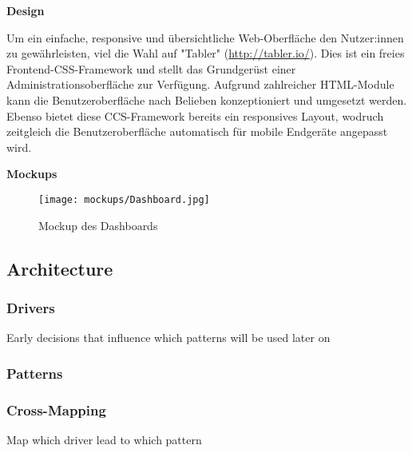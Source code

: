 \textbf{Design}

Um ein einfache, responsive und übersichtliche Web-Oberfläche den Nutzer:innen zu gewährleisten, viel die Wahl auf "Tabler" (\href{http://tabler.io/}{http://tabler.io/}). Dies ist ein freies Frontend-CSS-Framework
und stellt das Grundgerüst einer Administrationsoberfläche zur Verfügung. Aufgrund zahlreicher HTML-Module kann die Benutzeroberfläche nach Belieben konzeptioniert und 
umgesetzt werden. Ebenso bietet diese CCS-Framework bereits ein responsives Layout, wodruch zeitgleich die Benutzeroberfläche automatisch für mobile Endgeräte angepasst wird.

\textbf{Mockups}

\begin{figure}
\centering
\texttt{[image: mockups/Dashboard.jpg]}
\caption{Mockup des Dashboards}
\label{fig:mockups_dashboard}
\end{figure}

\subsection{Architecture}
\subsubsection{Drivers}
Early decisions that influence which patterns will be used later on
\subsubsection{Patterns}
\subsubsection{Cross-Mapping}
Map which driver lead to which pattern